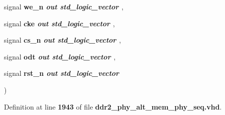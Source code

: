 {\begin{DoxyParamCaption}
\item[{\textcolor{keywordtype}{signal } }]{{\bfseries {\bfseries {\bf we\+\_\+n}} \textcolor{vhdlchar}{ }}\textcolor{stringliteral}{} {\em {\bfseries \textcolor{keywordflow}{out}\textcolor{vhdlchar}{ }\textcolor{comment}{std\+\_\+logic\+\_\+vector}\textcolor{vhdlchar}{ }\textcolor{vhdlchar}{ }\textcolor{vhdlchar}{ }}} , }
\item[{\textcolor{keywordtype}{signal } }]{{\bfseries {\bfseries {\bf cke}} \textcolor{vhdlchar}{ }}\textcolor{stringliteral}{} {\em {\bfseries \textcolor{keywordflow}{out}\textcolor{vhdlchar}{ }\textcolor{comment}{std\+\_\+logic\+\_\+vector}\textcolor{vhdlchar}{ }\textcolor{vhdlchar}{ }\textcolor{vhdlchar}{ }}} , }
\item[{\textcolor{keywordtype}{signal } }]{{\bfseries {\bfseries {\bf cs\+\_\+n}} \textcolor{vhdlchar}{ }}\textcolor{stringliteral}{} {\em {\bfseries \textcolor{keywordflow}{out}\textcolor{vhdlchar}{ }\textcolor{comment}{std\+\_\+logic\+\_\+vector}\textcolor{vhdlchar}{ }\textcolor{vhdlchar}{ }\textcolor{vhdlchar}{ }}} , }
\item[{\textcolor{keywordtype}{signal } }]{{\bfseries {\bfseries {\bf odt}} \textcolor{vhdlchar}{ }}\textcolor{stringliteral}{} {\em {\bfseries \textcolor{keywordflow}{out}\textcolor{vhdlchar}{ }\textcolor{comment}{std\+\_\+logic\+\_\+vector}\textcolor{vhdlchar}{ }\textcolor{vhdlchar}{ }\textcolor{vhdlchar}{ }}} , }
\item[{\textcolor{keywordtype}{signal } }]{{\bfseries {\bfseries {\bf rst\+\_\+n}} \textcolor{vhdlchar}{ }}\textcolor{stringliteral}{} {\em {\bfseries \textcolor{keywordflow}{out}\textcolor{vhdlchar}{ }\textcolor{comment}{std\+\_\+logic\+\_\+vector}\textcolor{vhdlchar}{ }\textcolor{vhdlchar}{ }\textcolor{vhdlchar}{ }}}}
\end{DoxyParamCaption}
)\hspace{0.3cm}{\ttfamily [Procedure]}}\label{classddr2__phy__alt__mem__phy__addr__cmd__pkg_a762ad6f3d76e3c01f0ef458e3dac73f6}


Definition at line {\bf 1943} of file {\bf ddr2\+\_\+phy\+\_\+alt\+\_\+mem\+\_\+phy\+\_\+seq.\+vhd}.

